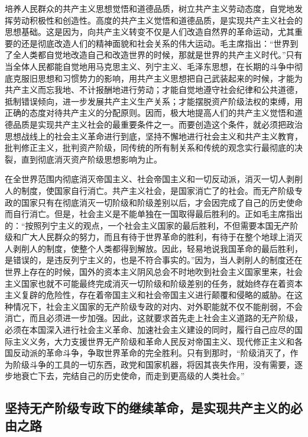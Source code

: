 \documentclass{book}
\begin{document}
培养人民群众的共产主义思想觉悟和道德品质，树立共产主义劳动态度，自党地发挥劳动积极性和创造性。高度的共产主义觉悟和道德品质，是实现共产主义社会的思想基础。这是因为，向共产主义转变不仅是人们改造自然界的革命运动，尤其重要的还是彻底改造人们的精神面貌和社会关系的伟大运动。毛主席指出：“世界到了全人类都自觉地改造自己和改造世界的时候，那就是世界的共产主义时代。”只有当全体人民都能自觉地用马克思主义、列宁主义、毛泽东思想，在长期的斗争中彻底克服旧思想和习惯势力的影响，用共产主义思想把自己武装起来的时候，才能为共产主义而忘我地、不计报酬地进行劳动；才能自觉地遵守社会纪律和公共道德，抵制错误倾向，进一步发展共产主义生产关系；才能摆脱资产阶级法权的束缚，用正确的态度对待共产主义的分配原则。因而，极大地提高人们的共产主义觉悟和道德品质是实现共产主义社会的最重要条件之一。而要创造这个条件，就必须把政治思想战线上的社会主义革命进行到底，坚持不懈地进行社会主义和共产主义教育，批判修正主义，批判资产阶级，同传统的所有制关系和传统的观念实行最彻底的决裂，直到彻底消灭资产阶级思想影响为止。

在全世界范围内彻底消灭帝国主义、社会帝国主义和一切反动派，消灭一切人剥削人的制度，使国家自行消亡。共产主义社会，是国家消亡了的社会。而无产阶级专政的国家只有在彻底消灭一切阶级和阶级差别以后，才会因完成了自己的历史使命而自行消亡。但是，社会主义是不能单独在一国取得最后胜利的。正如毛主席指出的：“按照列宁主义的观点，一个社会主义国家的最后胜利，不但需要本国无产阶级和广大人民群众的努力，而且有待于世界革命的胜利，有待于在整个地球上消灭人剥削人的制度，使整个人类都得到解放。因此，轻易地说我国革命的最后胜利，是错误的，是违反列宁主义的，也是不符合事实的。”因为，当人剥削人的制度还在世界上存在的时候，国外的资本主义阴风总会不时地吹到社会主义国家里来，社会主义国家也就不可能最终完成消灭一切阶级和阶级差别的任务，就始终存在着资本主义复辟的危险性，存在着帝国主义和社会帝国主义进行颠覆和侵略的威胁。在这种情况下，社会主义国家的无产阶级专政的对内、对外职能就不仅不能削弱，不会消亡，而且必须进一步加强。因此，这就要求首先走上社会主义道路的无产阶级，必须在本国深入进行社会主义革命、加速社会主义建设的同时，履行自己应尽的国际主义义务，大力支援世界无产阶级和革命人民反对帝国主义、现代修正主义和各国反动派的革命斗争，争取世界革命的完全胜利。只有到那时，“阶级消灭了，作为阶级斗争的工具的一切东西，政党和国家机器，将因其丧失作用，没有需要，逐步地衰亡下去，完结自己的历史使命，而走到更高级的人类社会。”

\subsection{坚持无产阶级专政下的继续革命，是实现共产主义的必由之路}
\end{document}
